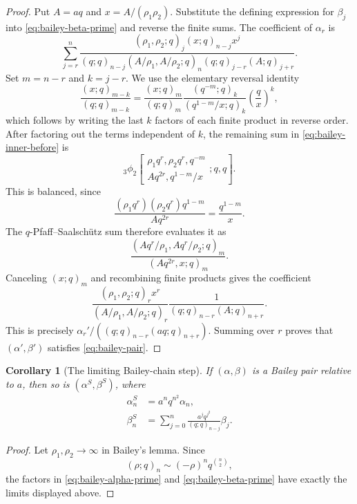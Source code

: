 \documentclass[11pt]{article}
\theoremstyle{blueplain}
\newtheorem{corollary}[theorem]{Corollary}
\theoremstyle{bluedef}
\begin{document}
\begin{proof}
Put $A=aq$ and $x=A/(\rho_1\rho_2)$.  Substitute the defining expression for $\beta_j$ into \eqref{eq:bailey-beta-prime} and reverse the finite sums.  The coefficient of $\alpha_r$ is
\begin{equation}\label{eq:bailey-inner-before}
\sum_{j=r}^{n}
\frac{(\rho_1,\rho_2;q)_j(x;q)_{n-j}x^j}
{(q;q)_{n-j}(A/\rho_1,A/\rho_2;q)_n
 (q;q)_{j-r}(A;q)_{j+r}}.
\end{equation}
Set $m=n-r$ and $k=j-r$.  We use the elementary reversal identity
\begin{equation}\label{eq:reverse-ratio}
\frac{(x;q)_{m-k}}{(q;q)_{m-k}}
=\frac{(x;q)_m}{(q;q)_m}
\frac{(q^{-m};q)_k}{(q^{1-m}/x;q)_k}
\left(\frac qx\right)^k,
\end{equation}
which follows by writing the last $k$ factors of each finite product in reverse order.  After factoring out the terms independent of $k$, the remaining sum in \eqref{eq:bailey-inner-before} is
\[
{}_3\phi_2\!\left[
\begin{matrix}\rho_1q^r,\rho_2q^r,q^{-m}\\
Aq^{2r},q^{1-m}/x
\end{matrix};q,q\right].
\]
This is balanced, since
\[
\frac{(\rho_1q^r)(\rho_2q^r)q^{1-m}}{Aq^{2r}}
=\frac{q^{1-m}}x.
\]
The $q$-Pfaff--Saalsch\"utz sum therefore evaluates it as
\[
\frac{(Aq^r/\rho_1,Aq^r/\rho_2;q)_m}
{(Aq^{2r},x;q)_m}.
\]
Canceling $(x;q)_m$ and recombining finite products gives the coefficient
\[
\frac{(\rho_1,\rho_2;q)_r x^r}
{(A/\rho_1,A/\rho_2;q)_r}
\frac1{(q;q)_{n-r}(A;q)_{n+r}}.
\]
This is precisely $\alpha_r'/((q;q)_{n-r}(aq;q)_{n+r})$.  Summing over $r$ proves that $(\alpha',\beta')$ satisfies \eqref{eq:bailey-pair}.
\end{proof}

\begin{corollary}[The limiting Bailey-chain step]\label{cor:bailey-S}
If $(\alpha,\beta)$ is a Bailey pair relative to $a$, then so is $(\alpha^{S},\beta^{S})$, where
\begin{align}
\alpha_n^{S}&=a^nq^{n^2}\alpha_n, \label{eq:S-alpha}\\
\beta_n^{S}&=\sum_{j=0}^{n}\frac{a^jq^{j^2}}{(q;q)_{n-j}}\beta_j. \label{eq:S-beta}
\end{align}
\end{corollary}

\begin{proof}
Let $\rho_1,\rho_2\to\infty$ in Bailey's lemma.  Since
\[
(\rho;q)_n\sim(-\rho)^nq^{\binom n2},
\]
the factors in \eqref{eq:bailey-alpha-prime} and \eqref{eq:bailey-beta-prime} have exactly the limits displayed above.
\end{proof}
\end{document}
